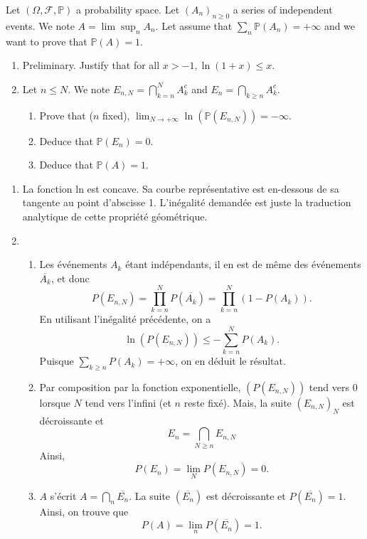\begin{Exercise}
  Let $(\Omega, \mathcal{F}, \mathbb{P})$ a probability space. Let $\left(A_n\right)_{n \geq 0}$ a series of independent events. We note $A=\lim \sup _n A_n$. Let assume that $\sum_n \mathbb{P}\left(A_n\right)=+\infty$ and we want to prove that $\mathbb{P}(A)=1$.
  \begin{enumerate}
    \item Preliminary. Justify that for all $x>-1, \ln (1+x) \leq x$.
    \item Let $n \leq N$. We note $E_{n, N}=\bigcap_{k=n}^N A_k^c$ and $E_n=\bigcap_{k \geq n} A_k^c$.
          \begin{enumerate}
            \item Prove that ($n$ fixed), $\lim _{N \rightarrow+\infty} \ln \left(\mathbb{P}\left(E_{n, N}\right)\right)=-\infty$.
            \item Deduce that $\mathbb{P}\left(E_n\right)=0$.
            \item Deduce that $\mathbb{P}(A)=1$.
          \end{enumerate}
  \end{enumerate}
\end{Exercise}

\begin{solution}
  \begin{enumerate}
    \item La fonction ln est concave. Sa courbe représentative est en-dessous de sa tangente au point d'abscisse 1. L'inégalité demandée est juste la traduction analytique de cette propriété géométrique.
    \item \begin{enumerate}
            \item Les événements $A_k$ étant indépendants, il en est de même des événements $\overline{A_k}$, et donc
                  $$
                    P\left(E_{n, N}\right)=\prod_{k=n}^N P\left(\overline{A_k}\right)=\prod_{k=n}^N\left(1-P\left(A_k\right)\right) .
                  $$
                  En utilisant l'inégalité précédente, on a
                  $$
                    \ln \left(P\left(E_{n, N}\right)\right) \leq-\sum_{k=n}^N P\left(A_k\right) .
                  $$
                  Puisque $\sum_{k \geq n} P\left(A_k\right)=+\infty$, on en déduit le résultat.
            \item Par composition par la fonction exponentielle, $\left(P\left(E_{n, N}\right)\right)$ tend vers 0 lorsque $N$ tend vers l'infini (et $n$ reste fixé). Mais, la suite $\left(E_{n, N}\right)_N$ est décroissante et
                  $$
                    E_n=\bigcap_{N \geq n} E_{n, N}
                  $$
                  Ainsi,
                  $$
                    P\left(E_n\right)=\lim _N P\left(E_{n, N}\right)=0 .
                  $$
            \item $A$ s'écrit $A=\bigcap_n \overline{E_n}$. La suite $\left(\overline{E_n}\right)$ est décroissante et $P\left(\overline{E_n}\right)=1$. Ainsi, on trouve que
                  $$
                    P(A)=\lim _n P\left(\overline{E_n}\right)=1 .
                  $$
          \end{enumerate}
  \end{enumerate}
\end{solution}